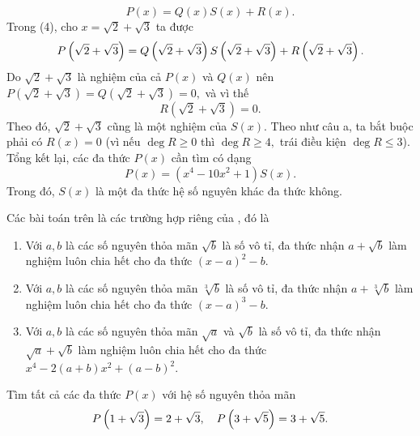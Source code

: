 \begin{bx}
{\begin{enumerate}[a,]
    \[P(x)=Q(x)S(x)+R(x).\tag{4}\]
    Trong (4), cho $x=\sqrt{2}+\sqrt{3}$ ta được
    $$P\left(\sqrt{2}+\sqrt{3}\right)=Q\left(\sqrt{2}+\sqrt{3}\right)S\left(\sqrt{2}+\sqrt{3}\right)+R\left(\displaystyle \sqrt{2}+\sqrt{3} \right).$$
     Do $\sqrt{2}+\sqrt{3}$ là nghiệm của cả $P(x)$ và $Q(x)$ nên $P\left(\sqrt{2}+\sqrt{3}\right)=Q\left(\sqrt{2}+\sqrt{3}\right)=0,$ và vì thế $$R\left(\sqrt{2}+\sqrt{3}\right)=0.$$
     Theo đó, $\sqrt{2}+\sqrt{3}$ cũng là một nghiệm của $S(x).$ Theo như câu a, ta bắt buộc phải có $R(x)=0$ (vì nếu $\deg R\ge 0$ thì $\deg R\ge 4,$ trái điều kiện $\deg R\le 3$).
     Tổng kết lại, các đa thức $P(x)$ cần tìm có dạng
     $$P(x)=\left(x^4-10x^2+1\right)S(x).$$
     Trong đó, $S(x)$ là một đa thức hệ số nguyên khác đa thức không.
\end{enumerate}}
\end{bx}

\begin{luuy}
Các bài toán trên là các trường hợp riêng của , đó là
\begin{enumerate}
    \item Với $a,b$ là các số nguyên thỏa mãn $\sqrt{b}$ là số vô tỉ, đa thức nhận $a+\sqrt{b}$ làm nghiệm luôn chia hết cho đa thức $(x-a)^2-b.$
    \item Với $a,b$ là các số nguyên thỏa mãn $\sqrt[3]{b}$ là số vô tỉ, đa thức nhận $a+\sqrt[3]{b}$ làm nghiệm luôn chia hết cho đa thức $(x-a)^3-b.$
    \item Với $a,b$ là các số nguyên thỏa mãn $\sqrt{a}$ và $\sqrt{b}$ là số vô tỉ, đa thức nhận $\sqrt{a}+\sqrt{b}$ làm nghiệm luôn chia hết cho đa thức $x^4-2(a+b)x^2+(a-b)^2.$
\end{enumerate}
\end{luuy}

\begin{bx}
Tìm tất cả các đa thức $P(x)$ với hệ số nguyên thỏa mãn
$$P\left(\displaystyle 1+\sqrt{3} \right)=2+\sqrt{3}, \quad P\left(\displaystyle 3+\sqrt{5} \right)=3+\sqrt{5}.$$
\end{bx}

